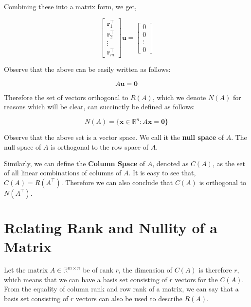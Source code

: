 \documentclass[a4paper]{article}
\begin{document}
Combining these into a matrix form, we get,

\begin{equation}
\begin{bmatrix}
\boldsymbol{r}_1^{\top}\\
\boldsymbol{r}_2^{\top}\\
\vdots\\
\boldsymbol{r}_m^{\top}
\end{bmatrix} \boldsymbol{u} = \begin{bmatrix}
0\\
0\\
\vdots\\
0
\end{bmatrix}
\end{equation}

Observe that the above can be easily written as follows:

\begin{equation}
A\boldsymbol{u} = \boldsymbol{0}
\end{equation}

Therefore the set of vectors orthogonal to $R(A)$, which we denote $N(A)$ for reasons which will be clear, can succinctly be defined as follows:

\begin{equation}
N(A) = \{\boldsymbol{x} \in \mathbb{R}^n: A\boldsymbol{x}=\boldsymbol{0}\}
\end{equation}

Observe that the above set is a vector space. We call it the \textbf{null space} of $A$. The null space of $A$ is orthogonal to the row space of $A$. 

Similarly, we can define the \textbf{Column Space} of $A$, denoted as $C(A)$, as the set of all linear combinations of columns of $A$. It is easy to see that, $C(A) = R(A^{\top})$. Therefore we can also conclude that $C(A)$ is orthogonal to $N(A^{\top})$.

\bigskip

\section{Relating Rank and Nullity of a Matrix}


Let the matrix $A \in \mathbb{R}^{m \times n}$ be of rank $r$, the dimension of $C(A)$ is therefore $r$, which means that we can have a basis set consisting of $r$ vectors for the $C(A)$. From the equality of column rank and row rank of a matrix, we can say that a basis set consisting of $r$ vectors can also be used to describe $R(A)$.
\end{document}
